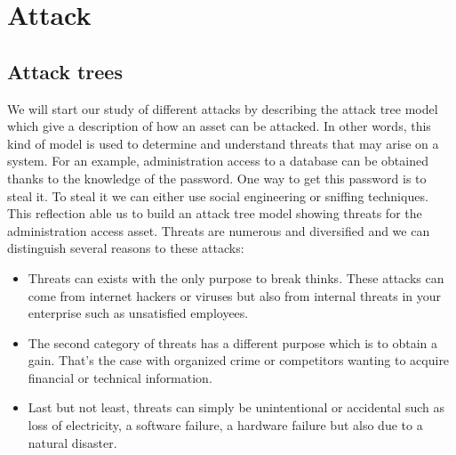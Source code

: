 \section{Attack}

\subsection{Attack trees}
We will start our study of different attacks by describing the attack tree model
which give a description of how an asset can be attacked. In other words, this
kind of model is used to determine and understand threats that may arise on a
system. For an example, administration access to a database can be obtained
thanks to the knowledge of the password. One way to get this password is to
steal it. To steal it we can either use social engineering or sniffing
techniques. This reflection able us to build an attack tree model showing threats
for the administration access asset. Threats are numerous and diversified and we
can distinguish several reasons to these attacks: \begin{itemize}{} \item
Threats can exists with the only purpose to break thinks. These attacks can come
from internet hackers or viruses but also from internal threats in your
enterprise such as unsatisfied employees. \item The second category of threats
has a different purpose which is to obtain a gain. That's the case with
organized crime or competitors wanting to acquire financial or technical
information. \item Last but not least, threats can simply be unintentional or
accidental such as loss of electricity, a software failure, a hardware failure
but also due to a natural disaster. \end{itemize}

